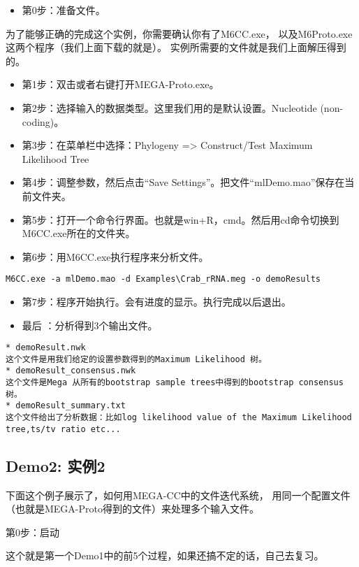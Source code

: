 \documentclass{ctexart}
\begin{document}
\begin{itemize}
\item 第0步：准备文件。
\end{itemize}
为了能够正确的完成这个实例，你需要确认你有了M6CC.exe，
以及M6Proto.exe这两个程序（我们上面下载的就是）。
实例所需要的文件就是我们上面解压得到的。
\begin{itemize}
\item 第1步：双击或者右键打开MEGA-Proto.exe。
\item 第2步：选择输入的数据类型。这里我们用的是默认设置。Nucleotide (non-coding)。
\item 第3步：在菜单栏中选择：Phylogeny => Construct/Test Maximum Likelihood Tree
\item 第4步：调整参数，然后点击“Save Settings”。把文件“mlDemo.mao”保存在当前文件夹。
\item 第5步：打开一个命令行界面。也就是win+R，cmd。然后用cd命令切换到M6CC.exe所在的文件夹。
\item 第6步：用M6CC.exe执行程序来分析文件。
\end{itemize}

\lstset{frame=single,frameround=tttt,language=Perl}
\begin{lstlisting}
M6CC.exe -a mlDemo.mao -d Examples\Crab_rRNA.meg -o demoResults
\end{lstlisting}
\begin{itemize}
\item 第7步：程序开始执行。会有进度的显示。执行完成以后退出。
\item 最后 ：分析得到3个输出文件。
\end{itemize}

\begin{verbatim}
* demoResult.nwk
这个文件是用我们给定的设置参数得到的Maximum Likelihood 树。
* demoResult_consensus.nwk
这个文件是Mega 从所有的bootstrap sample trees中得到的bootstrap consensus树。
* demoResult_summary.txt
这个文件给出了分析数据：比如log likelihood value of the Maximum Likelihood tree,ts/tv ratio etc...
\end{verbatim}
\subsection{Demo2: 实例2}
\label{sec-3-7}

下面这个例子展示了，如何用MEGA-CC中的文件迭代系统，
用同一个配置文件（也就是MEGA-Proto得到的文件）来处理多个输入文件。

第0步：启动

这个就是第一个Demo1中的前5个过程，如果还搞不定的话，自己去复习。
\end{document}
